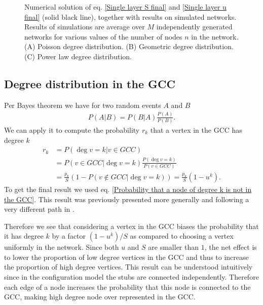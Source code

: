 \documentclass[
11pt, %
english, %
singlespacing, %
nolistspacing, %
liststotoc, %
headsepline, %
]{MastersDoctoralThesis} %
\begin{document}
{\begin{figure}
	\caption{Numerical solution of eq. \eqref{Single layer S final} and \eqref{Single layer u final} (solid black line), together with results on simulated networks. Results of simulations are average over $M$ independently generated networks for various values of the number of nodes $n$ in the network. (A) Poisson degree distribution. (B) Geometric degree distribution. (C) Power law degree distribution.}
	\label{Figure: Single layer S simulation}
\end{figure}
}


\subsection{Degree distribution in the GCC}
\label{Section: Degree distribution in the GCC}

Per Bayes theorem we have for two random events $A$ and $B$
\begin{align}
	P(A | B) = P(B | A) \frac{P(A)}{P(B)}. \label{Bayes theorem}
\end{align}
We can apply it to compute the probability $r_k$ that a vertex in the GCC has degree $k$
\begin{align}
	r_k &= P\left(\deg{v} = k | v \in GCC\right)\\
	&= P(v \in GCC | \deg{v} = k) \frac{P(\deg{v} = k)}{P(v \in GCC)} \\
	&= \frac{p_k}{S} \left(1 - P(v \notin GCC | \deg{v} = k)\right) =  \frac{p_k}{S} (1 - u^k). \label{Degree distribution in GCC}
\end{align}
To get the final result we used eq. \eqref{Probability that a node of degree k is not in the GCC}. This result was previously presented more generally and following a very different path in \cite{bauer2002maximal}.

Therefore we see that considering a vertex in the GCC biases the probability that it has degree $k$ by a factor $(1 - u^k)/S$ as compared to choosing a vertex uniformly in the network. Since both $u$ and $S$ are smaller than $1$, the net effect is to lower the proportion of low degree vertices in the GCC and thus to increase the proportion of high degree vertices. This result can be understood intuitively since in the configuration model the stubs are connected independently. Therefore each edge of a node increases the probability that this node is connected to the GCC, making high degree node over represented in the GCC.
\end{document}
